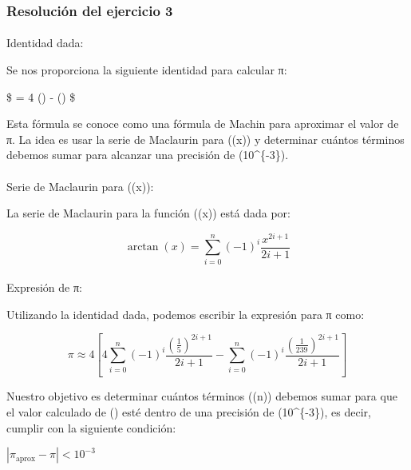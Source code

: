 \documentclass[
  letterpaper,
  DIV=11,
  numbers=noendperiod]{scrartcl}
\makeatletter
\let\oldparagraph\paragraph
\renewcommand{\paragraph}{
    \@ifstar
      \xxxParagraphStar
      \xxxParagraphNoStar
  }
\newcommand{\xxxParagraphStar}[1]{\oldparagraph*{#1}\mbox{}}
\newcommand{\xxxParagraphNoStar}[1]{\oldparagraph{#1}\mbox{}}
\makeatother
\begin{document}
\subsubsection{Resolución del ejercicio
3}\label{resoluciuxf3n-del-ejercicio-3}

\paragraph{Identidad dada:}\label{identidad-dada}

Se nos proporciona la siguiente identidad para calcular π:

\$  = 4 \arctan\left(\right) -
\arctan\left(\right) \$

Esta fórmula se conoce como una fórmula de Machin para aproximar el
valor de π. La idea es usar la serie de Maclaurin para (\arctan(x)) y
determinar cuántos términos debemos sumar para alcanzar una precisión de
(10\^{}\{-3\}).

\paragraph{\texorpdfstring{Serie de Maclaurin para
(\arctan(x)):}{Serie de Maclaurin para ((x)):}}\label{serie-de-maclaurin-para-x}

La serie de Maclaurin para la función (\arctan(x)) está dada por:

\[
\arctan(x) = \sum_{i=0}^n (-1)^i \frac{x^{2i+1}}{2i+1}
\]

\paragraph{Expresión de π:}\label{expresiuxf3n-de-ux3c0}

Utilizando la identidad dada, podemos escribir la expresión para π como:

\[
\pi \approx 4 \left[ 4 \sum_{i=0}^n (-1)^i \frac{\left(\frac{1}{5}\right)^{2i+1}}{2i+1} - \sum_{i=0}^n (-1)^i \frac{\left(\frac{1}{239}\right)^{2i+1}}{2i+1} \right]
\]

Nuestro objetivo es determinar cuántos términos ((n)) debemos sumar para
que el valor calculado de (\pi) esté dentro de una precisión de
(10\^{}\{-3\}), es decir, cumplir con la siguiente condición:

\(| \pi_{\text{aprox}} - \pi | < 10^{-3}\)
\end{document}
